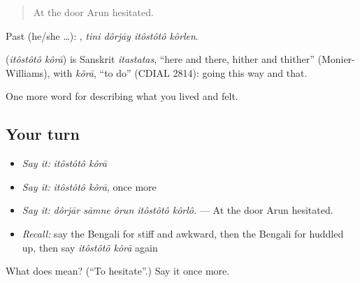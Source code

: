 \begin{quote}
At the door Arun hesitated.
\end{quote}

Past (he/she …):    , \emph{tini dôrjāy itôstôtô kôrlen}.

\begin{cousinweb}
\textbf{ } (\emph{itôstôtô kôrā}) is Sanskrit \emph{itastatas}, \textquotedblleft{}here and there, hither and thither\textquotedblright{} (Monier-Williams), with \emph{kôrā}, \textquotedblleft{}to do\textquotedblright{} (CDIAL 2814): going this way and that.
\end{cousinweb}

\begin{grammarlens}[title={What you've built}]
One more word for describing what you lived and felt.
\end{grammarlens}

\subsection*{Your turn}
\begin{itemize}
\raggedright
  \item \emph{Say it:} \emph{itôstôtô kôrā}
  \item \emph{Say it:} \emph{itôstôtô kôrā}, once more
  \item \emph{Say it:} \emph{dôrjār sāmne ôrun itôstôtô kôrlô.} — At the door Arun hesitated.
  \item \emph{Recall:} say the Bengali for stiff and awkward, then the Bengali for huddled up, then say \emph{itôstôtô kôrā} again
\end{itemize}

\begin{tcolorbox}[breakable,colback=teal!4,colframe=teal!35!black,title={Before you move on}]
What does   mean? (\textquotedblleft{}To hesitate\textquotedblright{}.) Say it once more.
\end{tcolorbox}
